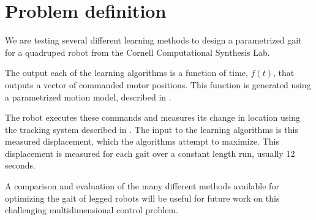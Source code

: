 \section{Problem definition}


We are testing several different learning methods to design a
parametrized gait for a quadruped robot from the Cornell Computational
Synthesis Lab.

The output each of the learning algorithms is a function of time,
$f(t)$, that outputs a vector of commanded motor positions.  This
function is generated using a parametrized motion model, described in
.

The robot executes these commands and measures its change in location
using the tracking system described in .  The input
to the learning algorithms is this measured displacement, which the
algorithms attempt to maximize. This displacement is measured for each
gait over a constant length run, usually 12 seconds.

A comparison and evaluation of the many different methods available
for optimizing the gait of legged robots will be useful for future
work on this challenging multidimensional control problem.

